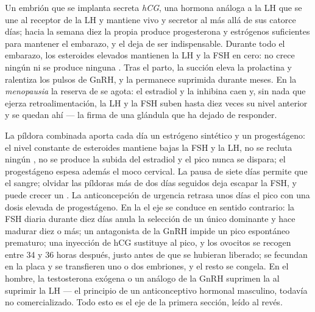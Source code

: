\begin{proposition}\label{prop:b2:reproductive-hormones:overrides}
Un embrión que se implanta secreta \emph{hCG}, una hormona análoga a la
LH que se une al receptor de la LH y mantiene vivo y secretor al  más allá de sus catorce días; hacia la semana diez la propia
 produce progesterona y estrógenos suficientes para mantener el
embarazo, y el  deja de ser indispensable. Durante todo el
embarazo, los esteroides elevados mantienen la LH y la FSH en cero: no
crece ningún  ni se produce ninguna . Tras el parto, la
succión eleva la prolactina y ralentiza los pulsos de GnRH, y la
 permanece suprimida durante meses. En la \emph{menopausia} la
reserva de  se agota: el estradiol y la inhibina caen y, sin
nada que ejerza retroalimentación, la LH y la FSH suben hasta diez veces
su nivel anterior y se quedan ahí --- la firma de una glándula que ha
dejado de responder.
\end{proposition}

\begin{proposition}\label{prop:b2:reproductive-hormones:clinic}
La píldora combinada aporta cada día un estrógeno sintético y un
progestágeno: el nivel constante de esteroides mantiene bajas la FSH y la
LH, no se recluta ningún , no se produce la subida del estradiol y
el pico nunca se dispara; el progestágeno espesa además el moco cervical.
La pausa de siete días permite que el  sangre; olvidar las
píldoras más de dos días seguidos deja escapar la FSH, y puede crecer un
. La anticoncepción de urgencia retrasa unos días el pico con una
dosis elevada de progestágeno. En la \emph{} el eje se
conduce en sentido contrario: la FSH diaria durante diez días anula la
selección de un único  dominante y hace madurar diez o más; un
antagonista de la GnRH impide un pico espontáneo prematuro; una inyección
de hCG sustituye al pico, y los ovocitos se recogen entre 34 y 36 horas
después, justo antes de que se hubieran liberado; se fecundan en la placa
y se transfieren uno o dos embriones, y el resto se congela. En el hombre,
la testosterona exógena o un análogo de la GnRH suprimen la
 al suprimir la LH --- el principio de un anticonceptivo
hormonal masculino, todavía no comercializado. Todo esto es el eje de la
primera sección, leído al revés.
\end{proposition}

